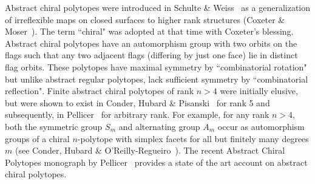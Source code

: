 \documentclass[12pt]{article}
\renewcommand{\>}{\rangle}
\theoremstyle{definition}\newtheorem{definition}{Definition}[section]
\begin{document}
Abstract chiral polytopes were introduced in Schulte \& Weiss~\cite{SW1991,SW1994} as a generalization of irreflexible maps on closed surfaces to higher rank structures (Coxeter \& Moser~\cite{CM1980}). The term ``chiral" was adopted at that time with Coxeter's blessing. Abstract chiral polytopes have an automorphism group with two orbits on the flags such that any two adjacent flags (differing by just one face) lie in distinct flag orbits. These polytopes have maximal symmetry by ``combinatorial rotation" but unlike abstract regular polytopes, lack sufficient symmetry by ``combinatorial reflection". Finite abstract chiral polytopes of rank $n>4$ were initially elusive, but were shown to exist in Conder, Hubard \& Pisanski~\cite{CHP2008} for rank 5 and subsequently, in Pellicer~\cite{P2010} for arbitrary rank. For example, for any rank $n>4$, both the symmetric group $S_m$ and alternating group $A_m$ occur as automorphism groups of a chiral $n$-polytope with simplex facets for all but finitely many degrees $m$ (see Conder, Hubard \& O’Reilly-Regueiro~\cite{CHO2024}). The recent Abstract Chiral Polytopes monograph by Pellicer~\cite{P2025} provides a state of the art account on abstract chiral polytopes.


\end{document}
